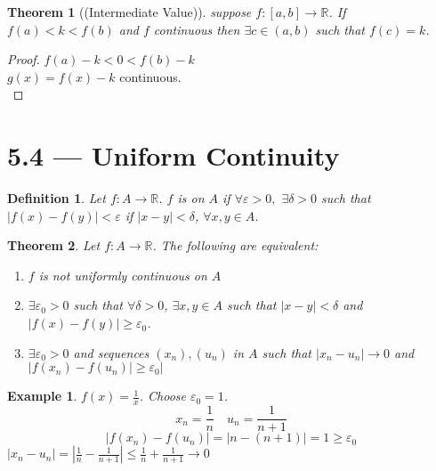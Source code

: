 \documentclass{report}
\newcommand{\R}{\mathbb{R}}  %
\newcommand{\xn}{(x_n)}
\theoremstyle{mystyle}
\newtheorem*{theorem}{Theorem}
\newtheorem*{definition}{Definition}
\newtheorem*{example}{Example}
\theoremstyle{customtheorem}
\begin{document}
    \begin{theorem}[(Intermediate Value)]
        suppose $f:[a,b]\to\R$. If $f(a)<k<f(b)$ and $f$ continuous then $\exists c\in(a,b)$ such that $f(c)=k$.
    \end{theorem}
    \begin{proof}
        $f(a)-k<0<f(b)-k$\\
        $g(x)=f(x)-k$ continuous.\\
    \end{proof}

    \section*{5.4 --- Uniform Continuity}
    \begin{definition}
        Let $f:A\to\R$. $f$ is  on $A$ if $\forall \varepsilon > 0,$ $\exists \delta > 0$ such that $\left|f(x)-f(y)\right|<\varepsilon$ if $|x-y|<\delta$, $\forall x,y\in A$.
    \end{definition}

    \begin{theorem}
        Let $f:A\to\R$. The following are equivalent:
        \begin{enumerate}[label=(\roman*)]
            \item $f$ is not uniformly continuous on $A$
            \item $\exists \varepsilon_0 > 0$ such that $\forall \delta > 0$, $\exists x,y\in A$ such that $|x-y|<\delta$ and $|f(x)-f(y)|\geq \varepsilon_0$.
            \item $\exists \varepsilon_0 > 0$ and sequences $\xn, (u_n)$ in $A$ such that $|x_n-u_n|\to 0$ and $|f\xn-f(u_n)|\geq \varepsilon_0|$
        \end{enumerate}
    \end{theorem}

    \begin{example}
        $f(x)=\frac{1}{x}$. Choose $\varepsilon_0=1$. \vspace{-1em}
        \[x_n=\frac{1}{n}\quad u_n=\frac{1}{n+1}\]
        \vspace{-1em}
        \[|f\xn-f(u_n)|=|n-(n+1)|=1\geq \varepsilon_0\]
        $|x_n-u_n|=|\frac{1}{n}-\frac{1}{n+1}|\leq \frac{1}{n}+\frac{1}{n+1}\to 0$
    \end{example}
\end{document}
